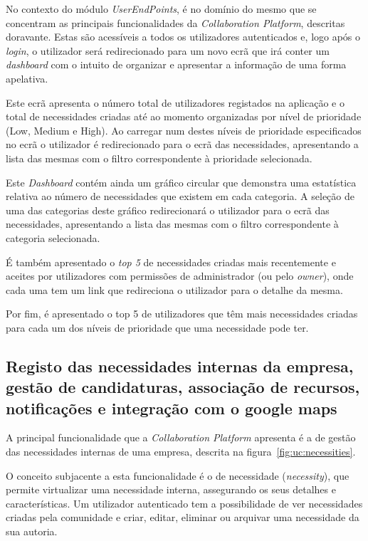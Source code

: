 No contexto do módulo \textit{UserEndPoints}, é no domínio do mesmo que se concentram as principais funcionalidades da \textit{Collaboration Platform}, descritas doravante. 
Estas são acessíveis a todos os utilizadores autenticados e, logo após o \textit{login}, o utilizador será redirecionado para um novo ecrã que irá conter um \textit{dashboard} com o intuito de organizar e 
apresentar a informação de uma forma apelativa. 
\par
Este ecrã apresenta o número total de utilizadores registados na aplicação e o total de necessidades criadas até ao momento organizadas por nível de prioridade (Low, Medium e High). 
Ao carregar num destes níveis de prioridade especificados no ecrã o utilizador é redirecionado para o ecrã das necessidades, apresentando a lista das mesmas com o filtro correspondente à prioridade selecionada. 
\par
Este \textit{Dashboard} contém ainda um gráfico circular que demonstra uma estatística relativa ao número de necessidades que existem em cada categoria. A seleção de uma das categorias deste gráfico redirecionará o utilizador para o ecrã das necessidades, apresentando a lista das mesmas com o filtro correspondente à categoria selecionada.
\par
É também apresentado o \textit{top 5} de necessidades criadas mais recentemente e aceites por utilizadores com permissões de administrador (ou pelo \textit{owner}), onde cada uma tem um link que redireciona o utilizador para o detalhe da mesma. 
\par
Por fim, é apresentado o top 5 de utilizadores que têm mais necessidades criadas para cada um dos níveis de prioridade que uma necessidade pode ter.

\subsection{Registo das necessidades internas da empresa, gestão de candidaturas, associação de recursos, notificações e integração com o google maps}\label{subsec:necessitiesCandidatesNotificationsGoogleMaps}

A principal funcionalidade que a \textit{Collaboration Platform} apresenta é a de gestão das necessidades internas de uma empresa, descrita na figura~\ref{fig:uc:necessities}.

\par
O conceito subjacente a esta funcionalidade é o de necessidade (\textit{necessity}), que permite virtualizar uma necessidade interna, assegurando os seus detalhes e características.
Um utilizador autenticado tem a possibilidade de ver necessidades criadas pela comunidade e criar, editar, eliminar ou arquivar uma necessidade da sua autoria.

